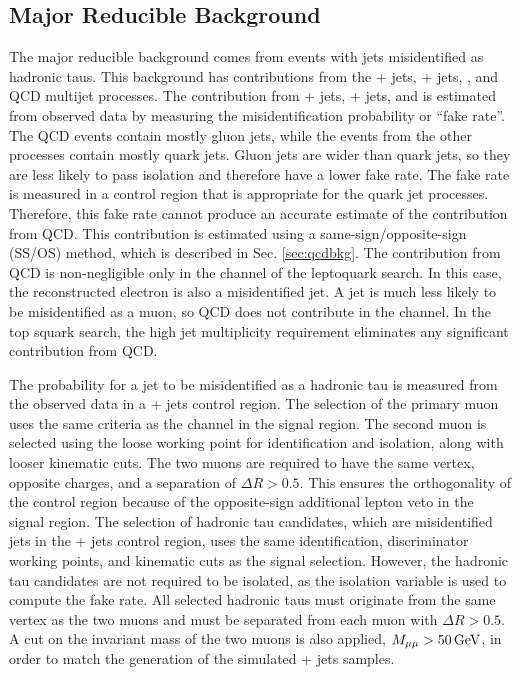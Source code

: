 \subsection{Major Reducible Background
\label{sec:faketaubkg}}

The major reducible background comes from events with jets misidentified as hadronic taus. This background has contributions from the \W + jets, \Z + jets, \ttbar, and QCD multijet processes. The contribution from \W + jets, \Z + jets, and \ttbar is estimated from observed data by measuring the misidentification probability or ``fake rate''. The QCD events contain mostly gluon jets, while the events from the other processes contain mostly quark jets. Gluon jets are wider than quark jets, so they are less likely to pass isolation and therefore have a lower fake rate. The fake rate is measured in a control region that is appropriate for the quark jet processes. Therefore, this fake rate cannot produce an accurate estimate of the contribution from QCD. This contribution is estimated using a same-sign/opposite-sign (SS/OS) method, which is described in Sec. \ref{sec:qcdbkg}. The contribution from QCD is non-negligible only in the \etau channel of the leptoquark search. In this case, the reconstructed electron is also a misidentified jet. A jet is much less likely to be misidentified as a muon, so QCD does not contribute in the \mutau channel. In the top squark search, the high jet multiplicity requirement eliminates any significant contribution from QCD.

The probability for a jet to be misidentified as a hadronic tau is measured from the observed data in a \Zmm + jets control region. The selection of the primary muon uses the same criteria as the \mutau channel in the signal region. The second muon is selected using the loose working point for identification and isolation, along with looser kinematic cuts. The two muons are required to have the same vertex, opposite charges, and a separation of $\Delta R > 0.5$. This ensures the orthogonality of the control region because of the opposite-sign additional lepton veto in the signal region. The selection of hadronic tau candidates, which are misidentified jets in the \Zmm + jets control region, uses the same identification, discriminator working points, and kinematic cuts as the signal selection. However, the hadronic tau candidates are not required to be isolated, as the isolation variable is used to compute the fake rate. All selected hadronic taus must originate from the same vertex as the two muons and must be separated from each muon with $\Delta R > 0.5$. A cut on the invariant mass of the two muons is also applied, $M_{\mu\mu} > 50\,\text{Ge\hspace{-.08em}V}$, in order to match the generation of the simulated \Z + jets samples.

